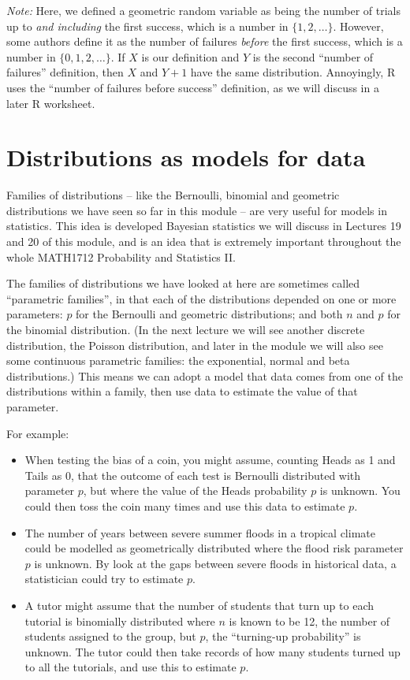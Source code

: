 \documentclass[
  a4paper,
]{book}
\providecommand{\tightlist}{%
  \setlength{\itemsep}{0pt}\setlength{\parskip}{0pt}}
\theoremstyle{definition}
\theoremstyle{definition}
\theoremstyle{definition}
\theoremstyle{definition}
\theoremstyle{remark}
\begin{document}
\emph{Note:} Here, we defined a geometric random variable as being the number of trials up to \emph{and including} the first success, which is a number in \(\{1, 2, \dots\}\). However, some authors define it as the number of failures \emph{before} the first success, which is a number in \(\{0, 1, 2,\dots\}\). If \(X\) is our definition and \(Y\) is the second ``number of failures'' definition, then \(X\) and \(Y+1\) have the same distribution. Annoyingly, R uses the ``number of failures before success'' definition, as we will discuss in a later R worksheet.

\hypertarget{models}{%
\section{Distributions as models for data}\label{models}}

Families of distributions -- like the Bernoulli, binomial and geometric distributions we have seen so far in this module -- are very useful for models in statistics. This idea is developed Bayesian statistics we will discuss in Lectures 19 and 20 of this module, and is an idea that is extremely important throughout the whole MATH1712 Probability and Statistics II.

The families of distributions we have looked at here are sometimes called ``parametric families'', in that each of the distributions depended on one or more parameters: \(p\) for the Bernoulli and geometric distributions; and both \(n\) and \(p\) for the binomial distribution. (In the next lecture we will see another discrete distribution, the Poisson distribution, and later in the module we will also see some continuous parametric families: the exponential, normal and beta distributions.) This means we can adopt a model that data comes from one of the distributions within a family, then use data to estimate the value of that parameter.

For example:

\begin{itemize}
\tightlist
\item
  When testing the bias of a coin, you might assume, counting Heads as 1 and Tails as 0, that the outcome of each test is Bernoulli distributed with parameter \(p\), but where the value of the Heads probability \(p\) is unknown. You could then toss the coin many times and use this data to estimate \(p\).
\item
  The number of years between severe summer floods in a tropical climate could be modelled as geometrically distributed where the flood risk parameter \(p\) is unknown. By look at the gaps between severe floods in historical data, a statistician could try to estimate \(p\).
\item
  A tutor might assume that the number of students that turn up to each tutorial is binomially distributed where \(n\) is known to be 12, the number of students assigned to the group, but \(p\), the ``turning-up probability'' is unknown. The tutor could then take records of how many students turned up to all the tutorials, and use this to estimate \(p\).
\end{itemize}
\end{document}
